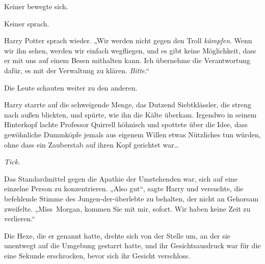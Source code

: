Keiner bewegte sich.

Keiner sprach.

Harry Potter sprach wieder.
„Wir werden nicht gegen den Troll \emph{kämpfen}. Wenn wir ihn sehen, werden wir einfach wegfliegen, und es gibt keine Möglichkeit, dass er mit uns auf einem Besen mithalten kann. Ich übernehme die Verantwortung dafür, es mit der Verwaltung zu klären. \emph{Bitte}.“

Die Leute schauten weiter zu den anderen.

\later

Harry starrte auf die schweigende Menge, das Dutzend Siebtklässler, die streng nach außen blickten, und spürte, wie ihn die Kälte überkam. Irgendwo in seinem Hinterkopf lachte Professor Quirrell höhnisch und spottete über die Idee, dass gewöhnliche Dummköpfe jemals aus eigenem Willen etwas Nützliches tun würden, ohne dass ein Zauberstab auf ihren Kopf gerichtet war…

\emph{Tick.}

Das Standardmittel gegen die Apathie der Umstehenden war, sich auf eine einzelne Person zu konzentrieren.
„Also gut“, sagte Harry und versuchte, die befehlende Stimme des Jungen-der-überlebte zu behalten, der nicht an Gehorsam zweifelte.
„Miss~Morgan, kommen Sie mit mir, sofort. Wir haben keine Zeit zu verlieren.“

Die Hexe, die er genannt hatte, drehte sich von der Stelle um, an der sie unentwegt auf die Umgebung gestarrt hatte, und ihr Gesichtsausdruck war für die eine Sekunde erschrocken, bevor sich ihr Gesicht verschloss.

